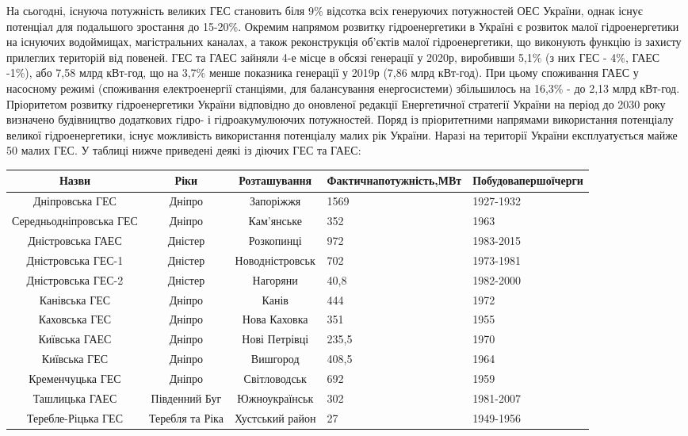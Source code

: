 \documentclass[12pt]{article}
\numberwithin{equation}{section}
\numberwithin{figure}{section}
\begin{document}
На сьогодні, існуюча потужність великих ГЕС становить біля 9\% відсотка всіх генеруючих потужностей ОЕС України, однак існує потенціал для подальшого зростання до 15-20\%. Окремим напрямом розвитку гідроенергетики в Україні є розвиток малої гідроенергетики на існуючих водоймищах, магістральних каналах, а також реконструкція об'єктів малої гідроенергетики, що виконують функцію із захисту прилеглих територій від повеней.
ГЕС та ГАЕС зайняли 4-е місце в обсязі генерації у 2020р, виробивши 5,1\% (з них ГЕС - 4\%, ГАЕС -1\%), або 7,58 млрд кВт-год, що на 3,7\% менше показника генерації у 2019р (7,86 млрд кВт-год). При цьому споживання ГАЕС у насосному режимі (споживання електроенергії станціями, для балансування енергосистеми) збільшилось на 16,3\% - до 2,13 млрд кВт-год.
Пріоритетом розвитку гідроенергетики України відповідно до оновленої редакції Енергетичної стратегії України на період до 2030 року визначено будівництво додаткових гідро- і гідроакумулюючих потужностей. Поряд із пріоритетними напрямами використання потенціалу великої гідроенергетики, існує можливість використання потенціалу малих рік України.
Наразі на території України експлуатується майже 50 малих ГЕС. У таблиці нижче приведені деякі із діючих ГЕС та ГАЕС:

\noindent\begin{tabular}{|c|c|c|p{2cm}|p{2cm}|}
\hline
Назви & Ріки & Розташування & Фактична\linebreak потужність,\linebreak МВт & Побудова\linebreak першої\linebreak черги \\
\hline
Дніпровська ГЕС	& Дніпро & Запоріжжя & 1569 & 1927-1932 \\
Середньодніпровська ГЕС	& Дніпро & Кам'янське	& 352	& 1963 \\
Дністровська ГАЕС	& Дністер	& Розкопинці	& 972	& 1983-2015 \\
Дністровська ГЕС-1	& Дністер	& Новодністровськ	& 702	& 1973-1981 \\
Дністровська ГЕС-2	& Дністер	& Нагоряни & 40,8	& 1982-2000 \\
Канівська ГЕС	& Дніпро	& Канів	& 444	& 1972 \\
Каховська ГЕС	& Дніпро	& Нова Каховка	& 351	& 1955 \\
Київська ГАЕС	& Дніпро	& Нові Петрівці	& 235,5	& 1970 \\
Київська ГЕС	& Дніпро	& Вишгород	& 408,5	& 1964 \\
Кременчуцька ГЕС	& Дніпро	& Світловодськ	& 692	& 1959 \\
Ташлицька ГАЕС	& Південний Буг	& Южноукраїнськ	& 302	& 1981-2007 \\
Теребле-Ріцька ГЕС	& Теребля та Ріка	& Хустський район	& 27	& 1949-1956 \\
\hline

\end{tabular}
\newpage
	
\end{document}
